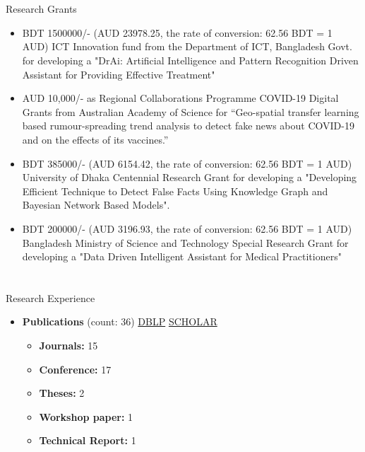 \documentclass{my_cv}
\begin{document}
\section{\faMoney}{Research Grants}

\begin{itemize}[noitemsep]
    \item BDT 1500000/- (AUD 23978.25, the rate of conversion: 62.56 BDT = 1 AUD) 
ICT Innovation fund from the Department of ICT, Bangladesh Govt. for developing a "DrAi: Artificial Intelligence and Pattern Recognition Driven Assistant for Providing Effective Treatment"
    \item AUD 10,000/- as Regional Collaborations Programme COVID-19 Digital Grants from Australian Academy of Science for “Geo-spatial transfer learning based rumour-spreading trend analysis to detect fake news about COVID-19 and on the effects of its vaccines.”
    \item BDT 385000/- (AUD 6154.42, the rate of conversion: 62.56 BDT = 1 AUD) 
University of Dhaka Centennial Research Grant for developing a "Developing Efficient Technique to Detect False Facts Using Knowledge Graph and Bayesian Network Based Models". 
    \item BDT 200000/- (AUD 3196.93, the rate of conversion: 62.56 BDT = 1 AUD)
Bangladesh Ministry of Science and Technology Special Research Grant for developing a "Data Driven Intelligent Assistant for Medical Practitioners"

\end{itemize}


\section{\faBinoculars}{Research Experience}
\begin{itemize}[noitemsep]
    \item \textbf{Publications} (count: 36) \hspace{10pt} \href{https://tinyurl.com/rrs885n}{\aidblp \hspace{5pt} DBLP} \hspace{10pt} \href{https://tinyurl.com/u92ce6l}{\aiGoogleScholarSquare \hspace{5pt} SCHOLAR}
        \begin{itemize}[noitemsep]
            \item \textbf{Journals:} 15
            \item \textbf{Conference:} 17
            \item \textbf{Theses:} 2
            \item \textbf{Workshop paper:} 1
            \item \textbf{Technical Report:} 1
        \end{itemize}
\end{itemize}
\end{document}
